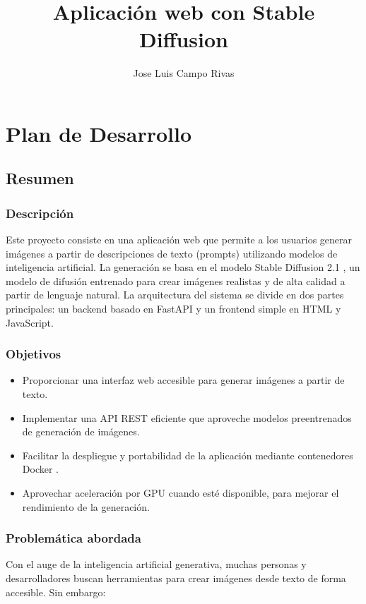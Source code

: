 \documentclass{article}
\title{Aplicación web con Stable Diffusion}
\author{Jose Luis Campo Rivas}
\date{\vspace{-2ex}}
\begin{document}
\maketitle

\section{Plan de Desarrollo}

\subsection{Resumen}

\subsubsection*{Descripción}
Este proyecto consiste en una aplicación web que permite a los usuarios generar imágenes a partir de descripciones de texto (prompts) utilizando modelos de inteligencia artificial. La generación se basa en el modelo Stable Diffusion 2.1 \cite{rombach2022high, stablediffusion21}, un modelo de difusión entrenado para crear imágenes realistas y de alta calidad a partir de lenguaje natural. La arquitectura del sistema se divide en dos partes principales: un backend basado en FastAPI \cite{ramirez2023fastapi} y un frontend simple en HTML y JavaScript.

\subsubsection*{Objetivos}

\begin{itemize}
  \item Proporcionar una interfaz web accesible para generar imágenes a partir de texto.
  \item Implementar una API REST eficiente que aproveche modelos preentrenados de generación de imágenes.
  \item Facilitar la despliegue y portabilidad de la aplicación mediante contenedores Docker \cite{docker2023}.
  \item Aprovechar aceleración por GPU cuando esté disponible, para mejorar el rendimiento de la generación.
\end{itemize}

\subsubsection*{Problemática abordada}
Con el auge de la inteligencia artificial generativa, muchas personas y desarrolladores buscan herramientas para crear imágenes desde texto de forma accesible. Sin embargo:
\end{document}
